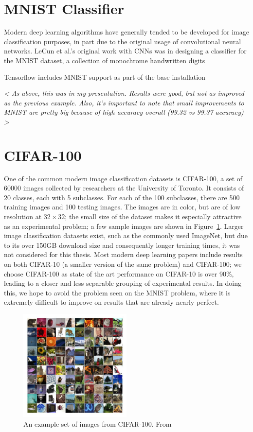 \section{MNIST Classifier}
Modern deep learning algorithms have generally tended to be developed for image classification purposes, in part due to the original usage of convolutional neural networks.
LeCun et al.'s original work with CNNs \cite{lecun1998gradient} was in designing a classifier for the MNIST dataset, a collection of monochrome handwritten digits 

Tensorflow includes MNIST support as part of the base installation

\emph{ < As above, this was in my presentation. Results were good, but not as improved as the previous example. Also, it's important to note that small improvements to MNIST are pretty big because of high accuracy overall (99.32 vs 99.37 accuracy) > }


\section{CIFAR-100}
One of the common modern image classification datasets is CIFAR-100, a set of 60000 images collected by researchers at the University of Toronto.
It consists of 20 classes, each with 5 subclasses.
For each of the 100 subclasses, there are 500 training images and 100 testing images.
The images are in color, but are of low resolution at $32\times 32$; the small size of the dataset makes it especially attractive as an experimental problem; a few sample images are shown in Figure~\ref{fig:cifar100}.
Larger image classification datasets exist, such as the commonly used ImageNet, but due to its over 150GB download size and consequently longer training times, it was not considered for this thesis.
Most modern deep learning papers include results on both CIFAR-10 (a smaller version of the same problem) and CIFAR-100; we choose CIFAR-100 as state of the art performance on CIFAR-10 is over 90\%, leading to a closer and less separable grouping of experimental results.
In doing this, we hope to avoid the problem seen on the MNIST problem, where it is extremely difficult to improve on results that are already nearly perfect.

\begin{figure}[!htb]
\centering
\includegraphics[width=0.5\textwidth]{images/cifar100}
\caption{An example set of images from CIFAR-100. From \cite{cifar100-sample}}
\label{fig:cifar100}
\end{figure}

